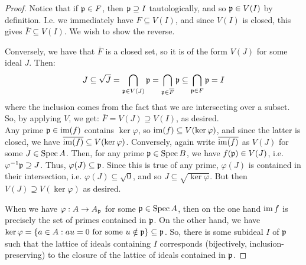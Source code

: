 \begin{proof}
	Notice that if $\mathfrak{p} \in F$, then $\mathfrak{p} \supseteq I$ tautologically, and so $\mathfrak{p} \in V(I)$ by definition. I.e. we immediately have $F \subseteq V(I)$, and since $V(I)$ is closed, this gives $\overline{F} \subseteq V(I)$. We wish to show the reverse.
	
	Conversely, we have that $\overline{F}$ is a closed set, so it is of the form $V(J)$ for some ideal $J$. Then:
	\[ J \subseteq \sqrt{J} = \bigcap_{\mathfrak{p} \in V(J)} \mathfrak{p} = \bigcap_{\mathfrak{p} \in \overline{F}} \mathfrak{p} \subseteq \bigcap_{\mathfrak{p} \in F} \mathfrak{p} = I \]
	where the inclusion comes from the fact that we are intersecting over a subset. So, by applying $V$, we get: $\overline{F} = V(J) \supseteq V(I)$, as desired. \\
	
	Any prime $\mathfrak{p} \in \operatorname{im}(f)$ contains $\ker\varphi$, so $\operatorname{im}(f) \subseteq V(\ker\varphi)$, and since the latter is closed, we have $\overline{\operatorname{im}(f)} \subseteq V(\ker\varphi)$. Conversely, again write $\overline{\operatorname{im}(f)}$ as $V(J)$ for some $J \in \operatorname{Spec} A$. Then, for any prime $\mathfrak{p} \in \operatorname{Spec} B$, we have $f(\mathfrak{p}) \in V(J)$, i.e. $\varphi^{-1}\mathfrak{p} \supseteq J$. Thus, $\varphi(J) \subseteq \mathfrak{p}$. Since this is true of any prime, $\varphi(J)$ is contained in their intersection, i.e. $\varphi(J) \subseteq \sqrt{0}$, and so $J \subseteq \sqrt{\ker\varphi}$. But then $V(J) \supseteq V(\ker\varphi)$ as desired.
	
	When we have $\varphi : A \to A_{\mathfrak{p}}$ for some $\mathfrak{p} \in \operatorname{Spec} A$, then on the one hand $\operatorname{im} f$ is precisely the set of primes contained in $\mathfrak{p}$. On the other hand, we have $\ker\varphi = \{ a \in A : au = 0 \text{ for some } u \notin \mathfrak{p}\} \subseteq \mathfrak{p}$. So, there is some subideal $I$ of $\mathfrak{p}$ such that the lattice of ideals containing $I$ corresponds (bijectively, inclusion-preserving) to the closure of the lattice of ideals contained in $\mathfrak{p}$.
\end{proof}
